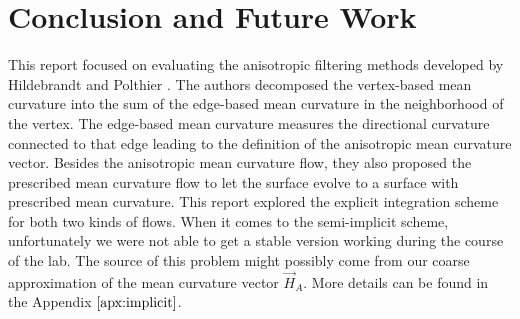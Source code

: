 \documentclass[11pt]{article}
\begin{document}
\section{Conclusion and Future Work}

This report focused on evaluating the anisotropic filtering methods developed by Hildebrandt and Polthier \cite{Hildebrandt04anisotropicfiltering}. The authors decomposed the vertex-based mean curvature into the sum of the edge-based mean curvature in the neighborhood of the vertex. The edge-based mean curvature measures the directional curvature connected to that edge leading to the definition of the anisotropic mean curvature vector. Besides the anisotropic mean curvature flow, they also proposed the prescribed mean curvature flow to let the surface evolve to a surface with prescribed mean curvature. This report explored the explicit integration scheme for both two kinds of flows. When it comes to the semi-implicit scheme, unfortunately we were not able to get a stable version working during the course of the lab. 
The source of this problem might possibly come from our coarse approximation of the mean curvature vector $\vec{H}_A$. More details can be found in the Appendix $\ref{apx:implicit}$.



\end{document}
